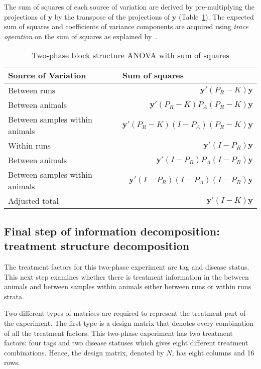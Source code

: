 \documentclass[article]{jss}
\begin{document}
The sum of squares of each source of variation are derived by pre-multiplying the projections of $\bm{y}$ by the transpose of the projections of $\bm{y}$ (Table~\ref{tab:block1SS}). The expected sum of squares and coefficients of variance components are acquired using \emph{trace operation} on the sum of squares as explained by~\cite{Searle1982}.

\begin{table}[ht]
\centering
\caption{Two-phase block structure ANOVA with sum of squares} 
\begin{tabular}[t]{lr}
\hline
\multicolumn{1}{l}{Source of Variation}  & \multicolumn{1}{l}{Sum of squares}\\
\hline
Between runs 					&$\bm{y}'(P_R - K)\bm{y}$ \\
\hspace{3mm}Between animals & $\bm{y}'(P_R - K)P_{A}(P_R - K)\bm{y}$ 	\\
\hspace{3mm}Between samples within animals		& $\bm{y}'(P_R - K)(I - P_{A})(P_R - K)\bm{y}$ \\
\hline
Within runs 					&$\bm{y}'(I-P_R)\bm{y}$ \\
\hspace{3mm}Between animals & $\bm{y}'(I-P_R)P_{A}(I-P_R)\bm{y}$\\
\hspace{3mm}Between samples within animals		&$\bm{y}'(I-P_R)(I - P_{A})(I-P_R)\bm{y}$ \\
\hline
Adjusted total  				&$\bm{y}'(I-K)\bm{y}$  \\
\hline
\end{tabular}
\label{tab:block1SS}
\end{table}

\subsection{Final step of information decomposition: treatment structure decomposition}{\label{subsec:trtDecomp}}
The treatment factors for this two-phase experiment are tag and disease status. This next step examines whether there is treatment information in the between animals and between samples within animals either between runs or within runs strata.

Two different types of matrices are required to represent the treatment part of the experiment. The first type is a design matrix that denotes every combination of all the treatment factors. This two-phase experiment has two treatment factors: four tags and two disease statuses which gives eight different treatment combinations. Hence, the design matrix, denoted by $N$, has eight columns and 16 rows.
\end{document}
